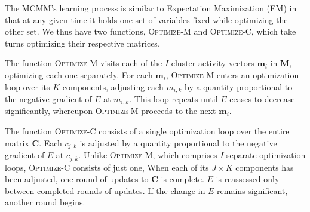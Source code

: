 The MCMM's learning process is similar to Expectation Maximization
(EM) in that at any given time it holds one set of variables 
fixed while optimizing the other set. We thus have two functions, \textsc{Optimize-M}
and \textsc{Optimize-C}, which take turns optimizing their respective matrices.

The function \textsc{Optimize-M} visits each of the $I$ cluster-activity vectors $\mathbf{m}_i$ in
$\mathbf{M}$, optimizing each one separately.
For each $\mathbf{m}_i$, \textsc{Optimize-M} enters an optimization 
loop over its $K$ components, adjusting each 
$m_{i,k}$ by a
quantity proportional to the negative gradient of $E$ at $m_{i,k}$. 
This loop repeats until $E$
ceases to decrease significantly,
whereupon \textsc{Optimize-M} proceeds to the next $\mathbf{m}_i$.  

The function \textsc{Optimize-C} consists of a single optimization loop over the 
entire matrix
$\mathbf{C}$. Each %
$c_{j,k}$ is adjusted by a quantity
proportional to the negative gradient of $E$ at $c_{j,k}$.
Unlike \textsc{Optimize-M}, which comprises $I$ separate optimization
loops, \textsc{Optimize-C} consists of just one, 
When each of its $J \times K$
components has been adjusted, one round of updates to $\mathbf{C}$ is
complete.  $E$ is reassessed only between completed rounds of
updates. If the change in $E$ remains significant, another round begins.  

